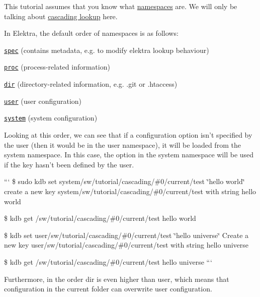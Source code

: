 This tutorial assumes that you know what \hyperlink{doc_tutorials_namespaces_md}{namespaces} are. We will only be talking about \hyperlink{md_doc_help_elektra-cascading_doc_help_elektra-cascading_md}{cascading lookup} here.

In Elektra, the default order of namespaces is as follows\+:


\begin{DoxyItemize}
\item \href{https://github.com/ElektraInitiative/libelektra/blob/master/doc/help/elektra-namespaces.md#spec}{\tt spec} (contains metadata, e.\+g. to modify elektra lookup behaviour)
\item \href{https://github.com/ElektraInitiative/libelektra/blob/master/doc/help/elektra-namespaces.md#proc}{\tt proc} (process-\/related information)
\item \href{https://github.com/ElektraInitiative/libelektra/blob/master/doc/help/elektra-namespaces.md#dir}{\tt dir} (directory-\/related information, e.\+g. {\ttfamily .git} or {\ttfamily .htaccess})
\item \href{https://github.com/ElektraInitiative/libelektra/blob/master/doc/help/elektra-namespaces.md#user}{\tt user} (user configuration)
\item \href{https://github.com/ElektraInitiative/libelektra/blob/master/doc/help/elektra-namespaces.md#system}{\tt system} (system configuration)
\end{DoxyItemize}

Looking at this order, we can see that if a configuration option isn't specified by the user (then it would be in the {\ttfamily user} namespace), it will be loaded from the {\ttfamily system} namespace. In this case, the option in the {\ttfamily system} namespace will be used if the key hasn't been defined by the user.

``` \$ sudo kdb set system/sw/tutorial/cascading/\#0/current/test \char`\"{}hello world\char`\"{} create a new key system/sw/tutorial/cascading/\#0/current/test with string hello world

\$ kdb get /sw/tutorial/cascading/\#0/current/test hello world

\$ kdb set user/sw/tutorial/cascading/\#0/current/test \char`\"{}hello universe\char`\"{} Create a new key user/sw/tutorial/cascading/\#0/current/test with string hello universe

\$ kdb get /sw/tutorial/cascading/\#0/current/test hello universe ```

Furthermore, in the order {\ttfamily dir} is even higher than {\ttfamily user}, which means that configuration in the current folder can overwrite user configuration.

